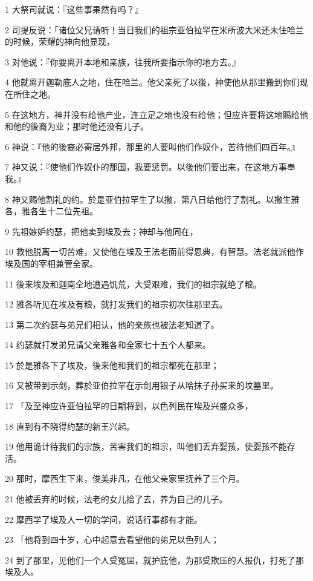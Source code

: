 \par 1 大祭司就说：『这些事果然有吗？』
\par 2 司提反说：「诸位父兄请听！当日我们的祖宗亚伯拉罕在米所波大米还未住哈兰的时候，荣耀的神向他显现，
\par 3 对他说：『你要离开本地和亲族，往我所要指示你的地方去。』
\par 4 他就离开迦勒底人之地，住在哈兰。他父亲死了以後，神使他从那里搬到你们现在所住之地。
\par 5 在这地方，神并没有给他产业，连立足之地也没有给他；但应许要将这地赐给他和他的後裔为业；那时他还没有儿子。
\par 6 神说：『他的後裔必寄居外邦，那里的人要叫他们作奴仆，苦待他们四百年。』
\par 7 神又说：『使他们作奴仆的那国，我要惩罚。以後他们要出来，在这地方事奉我。』
\par 8 神又赐他割礼的约。於是亚伯拉罕生了以撒，第八日给他行了割礼。以撒生雅各，雅各生十二位先祖。
\par 9 先祖嫉妒约瑟，把他卖到埃及去；神却与他同在，
\par 10 救他脱离一切苦难，又使他在埃及王法老面前得恩典，有智慧。法老就派他作埃及国的宰相兼管全家。
\par 11 後来埃及和迦南全地遭遇饥荒，大受艰难，我们的祖宗就绝了粮。
\par 12 雅各听见在埃及有粮，就打发我们的祖宗初次往那里去。
\par 13 第二次约瑟与弟兄们相认，他的亲族也被法老知道了。
\par 14 约瑟就打发弟兄请父亲雅各和全家七十五个人都来。
\par 15 於是雅各下了埃及，後来他和我们的祖宗都死在那里；
\par 16 又被带到示剑，葬於亚伯拉罕在示剑用银子从哈抹子孙买来的坟墓里。
\par 17 「及至神应许亚伯拉罕的日期将到，以色列民在埃及兴盛众多，
\par 18 直到有不晓得约瑟的新王兴起。
\par 19 他用诡计待我们的宗族，苦害我们的祖宗，叫他们丢弃婴孩，使婴孩不能存活。
\par 20 那时，摩西生下来，俊美非凡，在他父亲家里抚养了三个月。
\par 21 他被丢弃的时候，法老的女儿拾了去，养为自己的儿子。
\par 22 摩西学了埃及人一切的学问，说话行事都有才能。
\par 23 「他将到四十岁，心中起意去看望他的弟兄以色列人；
\par 24 到了那里，见他们一个人受冤屈，就护庇他，为那受欺压的人报仇，打死了那埃及人。
